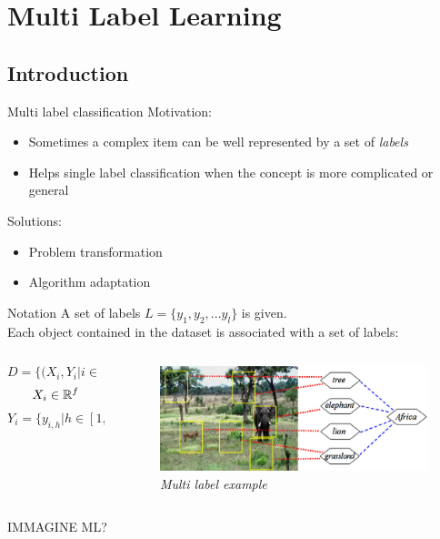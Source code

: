  \section{Multi Label Learning}
 
\subsection*{Introduction}
\begin{frame}{Multi label classification}
	Motivation:
	\begin{itemize}\setlength\itemsep{1em}
		\item Sometimes a complex item can be well represented by a set of \textit{labels}
		\item Helps single label classification when the concept is more complicated or general
	\end{itemize}
	Solutions:
	\begin{itemize}\setlength\itemsep{1em}
		\item Problem transformation
		\item Algorithm adaptation
	\end{itemize}
\end{frame}

\begin{frame}{Notation}
	A set of labels $L = \{y_1, y_2,... y_l\}$ is given.\\
	Each object contained in the dataset is associated with a set of labels:
	\begin{columns}
		\begin{column}{0.5\textwidth}\centering
		$$D = \{(X_i, Y_i | i \in [1, n]\}$$
		$$X_i \in \mathbb{R}^f$$
		$$Y_i = \{y_{i,h} | h \in [1, h_i], y_{i,h} \in L, h_i \leq l\}$$
		\end{column}
		\begin{column}{0.5\textwidth}\centering
		\begin{figure}[htbp]
			\centering
			\includegraphics[scale = 0.3]{./images/ml1.png}
			\caption{\textit{Multi label example}}
		\end{figure}
		\end{column}
	\end{columns}
	
	
	\color{red}IMMAGINE ML?
	
\end{frame}

